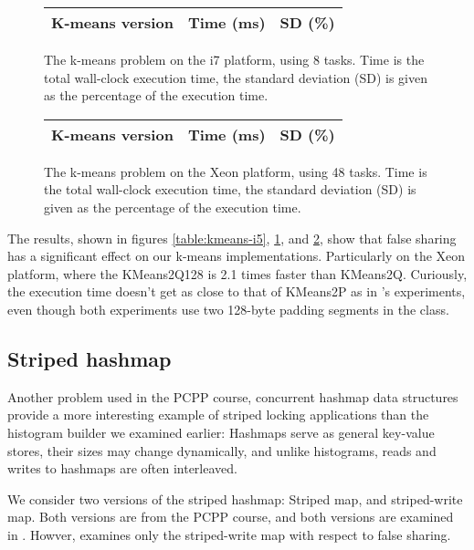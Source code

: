 \begin{figure}[hbtp]
	\centering
	\begin{tabular}{l r r}
		\hline
		\hline
		K-means version & Time (ms) & SD (\%) \\
		\hline
		
		\hline
		\hline
	\end{tabular}
	\caption{The k-means problem on the i7 platform, using 8 tasks.  Time is
	the total wall-clock execution time, the standard deviation (SD) is
	given as the percentage of the execution time.}
	\label{table:kmeans-i7}
\end{figure}

\begin{figure}[hbtp]
	\centering
	\begin{tabular}{l r r}
		\hline
		\hline
		K-means version & Time (ms) & SD (\%) \\
		\hline
		
		\hline
		\hline
	\end{tabular}
	\caption{The k-means problem on the Xeon platform, using 48 tasks.
	Time is the total wall-clock execution time, the standard deviation (SD)
	is given as the percentage of the execution time.}
	\label{table:kmeans-xeon}
\end{figure}

The results, shown in figures \ref{table:kmeans-i5}, \ref{table:kmeans-i7}, and
\ref{table:kmeans-xeon}, show that false sharing has a significant effect on our 
k-means implementations. Particularly on the Xeon platform, where the KMeans2Q128
is 2.1 times faster than KMeans2Q. Curiously, the execution time doesn't get as
close to that of KMeans2P as in \citeauthor{mystery}'s experiments, even though
both experiments use two 128-byte padding segments in the  class.

\subsection{Striped hashmap}
Another problem used in the PCPP course, concurrent hashmap data structures
provide a more interesting example of striped locking applications than the
histogram builder we examined earlier: Hashmaps serve as general key-value
stores, their sizes may change dynamically, and unlike histograms, reads
and writes to hashmaps are often interleaved.

We consider two versions of the striped hashmap: Striped map, and striped-write
map. Both versions are from the PCPP course, and both versions are examined in
\cite{mystery}. Howver, \cite{mystery} examines only the striped-write map
with respect to false sharing.

